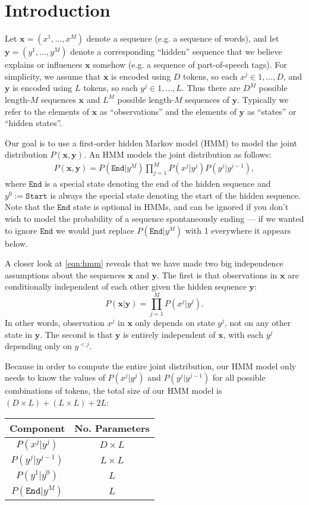 \documentclass{article}
\newcommand{\x}{\textbf{x}}
\newcommand{\y}{\textbf{y}}
\newcommand{\END}{\texttt{End}}
\newcommand{\START}{\texttt{Start}}
\begin{document}
\pagestyle{fancy}

\section{Introduction}

Let $\x = (x^1,\ldots,x^M)$ denote a sequence (e.g. a sequence of words), and let $\y = (y^1,\ldots,y^M)$ denote a corresponding ``hidden'' sequence that we believe explains or influences $\x$ somehow (e.g. a sequence of part-of-speech tags).  For simplicity, we assume that $\x$ is encoded using $D$ tokens, so each $x^j \in 1, ..., D$, and $\y$ is encoded using $L$ tokens, so each $y^j \in 1, ..., L$.  Thus there are $D^M$ possible length-$M$ sequences $\x$ and $L^M$ possible length-$M$ sequences of $\y$.  Typically we refer to the elements of $\x$ as ``observations'' and the elements of $\y$ as ``states'' or ``hidden states''.

Our goal is to use a first-order hidden Markov model (HMM) to model the joint distribution $P(\x,\y)$.   An HMM models the joint distribution as follows:
\begin{eqnarray}P(\x,\y) = P(\END|y^M)\prod_{j=1}^{M}P(x^j|y^j)P(y^j|y^{j-1}),\label{eqn:hmm}\end{eqnarray}
where $\END$ is a special state denoting the end of the hidden sequence and $y^0 := \START$ is always the special state denoting the start of the hidden sequence.  Note that the $\END$ state is optional in HMMs, and can be ignored if you don't wish to model the probability of a sequence spontaneously ending --- if we wanted to ignore $\END$ we would just replace $P(\END|y^M)$ with 1 everywhere it appears below.

A closer look at \eqref{eqn:hmm} reveals that we have made two big independence assumptions about the sequences $\x$ and $\y$.  The first is that observations in $\x$ are conditionally independent of each other given the hidden sequence $\y$:
$$P(\x|\y) = \prod_{j=1}^MP(x^j|y^j).$$
In other words, observation $x^j$ in $\x$ only depends on state $y^j$, not on any other state in $\y$.  The second is that $\y$ is entirely independent of $\x$, with each $y^j$ depending only on $y^{<j}$.

Because in order to compute the entire joint distribution, our HMM model only needs to know the values of $P(x^j|y^j)$ and $P(y^j|y^{j-1})$ for all possible combinations of tokens, the total size of our HMM model is $(D \times L) + (L \times L) + 2L$:

\begin{center}
\begin{tabular}{|c|c|}
\hline
Component & No. Parameters\\
\hline
$P(x^j|y^j)$ & $D\times L$\\
$P(y^j|y^{j-1})$ & $L\times L$\\
$P(y^1|y^0)$ & $L$\\
$P(\END|y^M)$ & $L$\\
\hline
\end{tabular}
\end{center}
\end{document}
